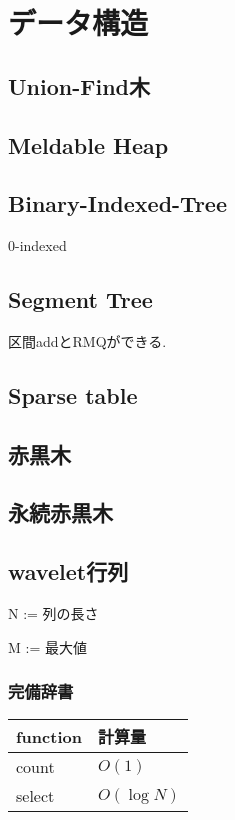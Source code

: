 \section{データ構造}
\subsection{Union-Find木}


\subsection{Meldable Heap}


\subsection{Binary-Indexed-Tree}
0-indexed

\subsection{Segment Tree}
区間addとRMQができる.


\subsection{Sparse table}


\subsection{赤黒木}

\subsection{永続赤黒木}

\subsection{wavelet行列}
N := 列の長さ\par
M := 最大値\\
\subsubsection{完備辞書}
\begin{table} [htb]
  \begin{tabular} { |l|l| } \hline
    function & 計算量 \\ \hline
    count & $O(1)$ \\ \hline
    select & $O(\log N)$ \\ \hline
  \end{tabular}
\end{table}

